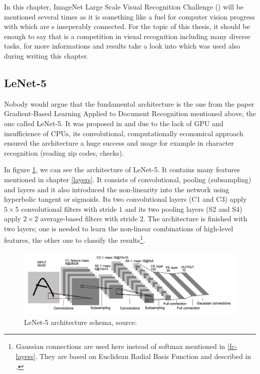 In this chapter, ImageNet Large Scale Visual Recognition Challenge () will be mentioned several times as it is something like a fuel for computer vision progress with which are s inseperably connected. For the topic of this thesis, it should be enough to say that  is a competition in visual recognition including many diverse tasks, for more informations and results take a look into \cite{ILSVRC} which was used also during writing this chapter.

\subsection{LeNet-5} %
\label{lenet}

Nobody would argue that the fundamental architecture is the one from the paper Gradient-Based Learning Applied to Document Recognition mentioned above, the one called LeNet-5. It was proposed in \cite{lenet5} and due to the lack of GPU and insufficience of CPUs, its convolutional, computationally economical approach ensured the architecture a huge success and usage for example in character recognition (reading zip codes, checks). 

In figure \ref{fig:lenet}, we can see the architecture of LeNet-5. It contains many features mentioned in chapter \ref{layers}. It consists of convolutional, pooling (subsampling) and  layers and it also introduced the non-linearity into the network using hyperbolic tangent or sigmoids. Its two convolutional layers (C1 and C3) apply $5 \times 5$ convolutional filters with stride $1$ and its two pooling layers (S2 and S4) apply $2 \times 2$ average-based filters with stride $2$. The architecture is finished with two  layers; one is needed to learn the non-linear combinations of high-level features, the other one to classify the results\footnote{Gaussian connections are used here instead of softmax mentioned in \ref{fc-layers}. They are based on Euclidean Radial Basis Function and described in \cite{lenet5}.}.

\begin{figure}[H]
   \centering
	\includegraphics[width=\linewidth]{./pictures/lenet.png}
	\caption[LeNet-5 architecture]{LeNet-5 architecture schema, source: \cite{lenet5}}
      \label{fig:lenet}
\end{figure}

